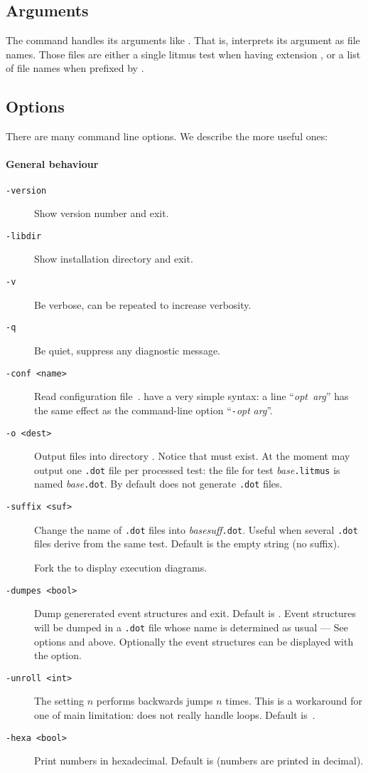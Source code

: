 \subsection{Arguments}
The command \herd{} handles its arguments like \litmus.
That is, \herd{} interprets its argument as file names.
Those files are either a single litmus test
when having extension , or a list of file names
when prefixed by .


\subsection{Options}
There are many command line options.
We describe the more useful ones:

\paragraph*{General behaviour}
\begin{description}
\item[{\tt -version}] Show version number and exit.
\item[{\tt -libdir}] Show installation directory and exit.
\item[{\tt -v}] Be verbose, can be repeated to increase verbosity.
\item[{\tt -q}] Be quiet, suppress any diagnostic message.
\item[{\tt -conf <name>}] Read configuration file~.
 have a very simple syntax:
a line ``\textit{opt}\texttt{  }\textit{arg}'' has the same effect as
the command-line option ``\texttt{-}\textit{opt} \textit{arg}''.
\item[{\tt -o <dest>}] Output files into directory .
Notice that  must exist.
At the moment \herd{} may output one \texttt{.dot} file per processed test:
the file for test \textit{base}\texttt{.litmus}
is named  \textit{base}\texttt{.dot}.
By default \herd{} does not generate \texttt{.dot} files.
\item[{\tt -suffix <suf>}] Change the name of \texttt{.dot} files
into \textit{base}\textit{suff}\texttt{.dot}. Useful when several \texttt{.dot} files derive from the same test. Default is the empty string (no suffix).
\item[{\tt {}}] Fork the  to display execution diagrams.
\item[{\tt -dumpes <bool>}]
Dump genererated event structures and exit. Default is .
Event structures will be dumped in a \texttt{.dot} file whose
name is determined as usual --- See options  and  above.
Optionally the event structures can be displayed with the  option.
\item[{\tt -unroll <int>}] The setting $n$ performs backwards
jumps $n$ times. This is a workaround for one of \herd{} main limitation:
\herd{} does not really handle loops. Default is~.
\item[{\tt -hexa <bool>}] Print numbers in hexadecimal. Default is 
(numbers are printed in decimal).
\end{description}

